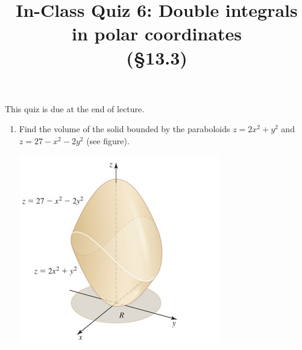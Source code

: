 \documentclass[]{article}
\title{\vspace{-3.5pc} 
	\flushleft \bf \Large In-Class Quiz 6: Double integrals in polar coordinates \\ (\S 13.3)}
\date{}
\begin{document}
\maketitle

\vspace{-3pc}
 This quiz is due at the end of lecture.  

\noindent\hrulefill

\begin{enumerate}

\item %
Find the volume of the solid bounded by the paraboloids $z=2x^2+y^2$ and $z=27-x^2-2y^2$ (see figure).

\begin{center}
\includegraphics{13-3no20}
\end{center}


\end{enumerate}
\end{document}
